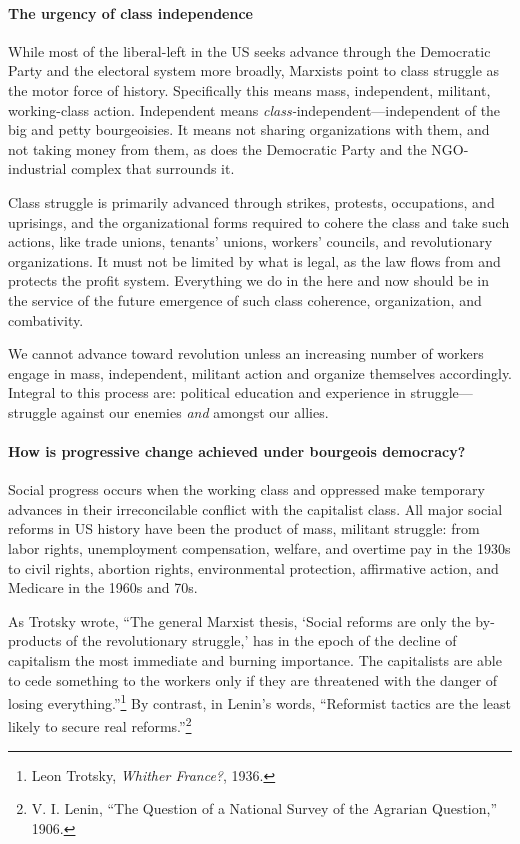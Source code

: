 \paragraph{The urgency of class independence}

While most of the liberal-left in the US seeks advance through the Democratic Party and the electoral system more broadly, Marxists point to class struggle as the motor force of history. Specifically this means mass, independent, militant, working-class action. Independent means \emph{class-}independent---independent of the big and petty bourgeoisies. It means not sharing organizations with them, and not taking money from them, as does the Democratic Party and the NGO-industrial complex that surrounds it.

Class struggle is primarily advanced through strikes, protests, occupations, and uprisings, and the organizational forms required to cohere the class and take such actions, like trade unions, tenants' unions, workers' councils, and revolutionary organizations. It must not be limited by what is legal, as the law flows from and protects the profit system. Everything we do in the here and now should be in the service of the future emergence of such class coherence, organization, and combativity.

We cannot advance toward revolution unless an increasing number of workers engage in mass, independent, militant action and organize themselves accordingly. Integral to this process are: political education and experience in struggle---struggle against our enemies \emph{and} amongst our allies.

\paragraph{How is progressive change achieved under bourgeois democracy?}

Social progress occurs when the working class and oppressed make temporary advances in their irreconcilable conflict with the capitalist class. All major social reforms in US history have been the product of mass, militant struggle: from labor rights, unemployment compensation, welfare, and overtime pay in the 1930s to civil rights, abortion rights, environmental protection, affirmative action, and Medicare in the 1960s and 70s.

As Trotsky wrote, ``The general Marxist thesis, `Social reforms are only the by-products of the revolutionary struggle,' has in the epoch of the decline of capitalism the most immediate and burning importance. The capitalists are able to cede something to the workers only if they are threatened with the danger of losing everything.''\footnote{Leon Trotsky, \emph{Whither France?}, 1936.} By contrast, in Lenin's words, ``Reformist tactics are the least likely to secure real reforms.''\footnote{V. I. Lenin, ``The Question of a National Survey of the Agrarian Question,'' 1906.}

